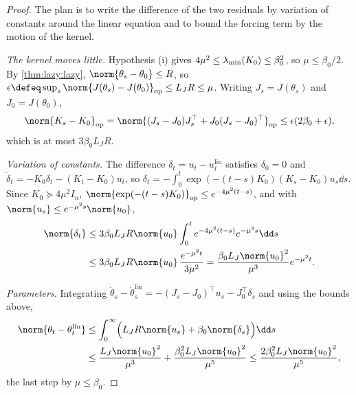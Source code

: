 \begin{refsection}

\begin{proof}
The plan is to write the difference of the two residuals by variation of constants around the linear equation and to bound the forcing term by the motion of the kernel.

\emph{The kernel moves little.} Hypothesis (i) gives $4\mu^2\le\lambda_{\min}(K_0)\le\beta_0^2$, so $\mu\le\beta_0/2$. By \cref{thm:lazy:lazy}, $\norm{\theta_s-\theta_0}\le R$, so $\epsilon\defeq\sup_s\norm{J(\theta_s)-J(\theta_0)}_{\op}\le L_JR\le\mu$. Writing $J_s=J(\theta_s)$ and $J_0=J(\theta_0)$,
\[
  \norm{K_s-K_0}_{\op}=\norm{(J_s-J_0)J_s^\top+J_0(J_s-J_0)^\top}_{\op}\le\epsilon(2\beta_0+\epsilon),
\]
which is at most $3\beta_0L_JR$.

\emph{Variation of constants.} The difference $\delta_t=u_t-u^{\mathrm{lin}}_t$ satisfies $\delta_0=0$ and $\dot\delta_t=-K_0\delta_t-(K_t-K_0)u_t$, so $\delta_t=-\int_0^t\exp(-(t-s)K_0)(K_s-K_0)u_s\dd s$. Since $K_0\succeq4\mu^2I_n$, $\norm{\exp(-(t-s)K_0)}_{\op}\le e^{-4\mu^2(t-s)}$, and with $\norm{u_s}\le e^{-\mu^2s}\norm{u_0}$,
\begin{align*}
  \norm{\delta_t}&\le3\beta_0L_JR\norm{u_0}\int_0^te^{-4\mu^2(t-s)}e^{-\mu^2s}\dd s\\
  &\le3\beta_0L_JR\norm{u_0}\,\frac{e^{-\mu^2t}}{3\mu^2}=\frac{\beta_0L_J\norm{u_0}^2}{\mu^3}e^{-\mu^2t}.
\end{align*}

\emph{Parameters.} Integrating $\dot\theta_s-\dot\theta^{\mathrm{lin}}_s=-(J_s-J_0)^\top u_s-J_0^\top\delta_s$ and using the bounds above,
\begin{align*}
  \norm{\theta_t-\theta^{\mathrm{lin}}_t}&\le\int_0^\infty\Bigl(L_JR\norm{u_s}+\beta_0\norm{\delta_s}\Bigr)\dd s\\
  &\le\frac{L_J\norm{u_0}^2}{\mu^3}+\frac{\beta_0^2L_J\norm{u_0}^2}{\mu^5}\le\frac{2\beta_0^2L_J\norm{u_0}^2}{\mu^5},
\end{align*}
the last step by $\mu\le\beta_0$.


\end{proof}
\end{refsection}
